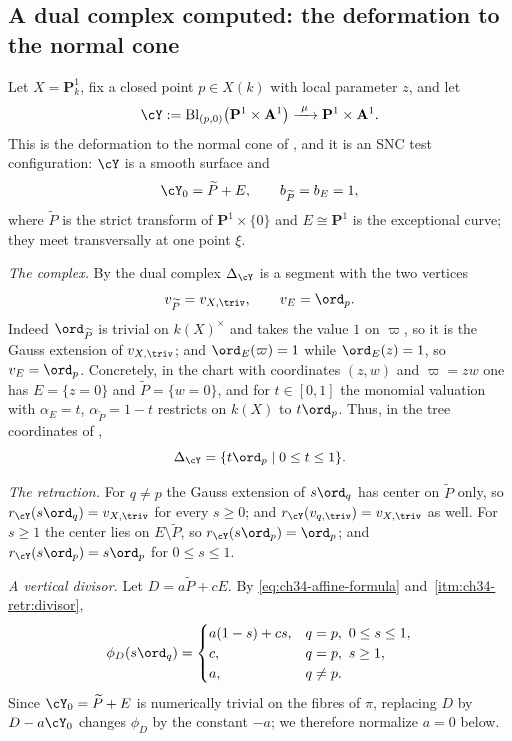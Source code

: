 \subsection{A dual complex computed: the deformation to the normal cone}

\begin{example}
\label{ex:ch34-normal-cone-segment}
Let $X=\mathbf P^1_k$, fix a closed point $p\in X(k)$ with local
parameter $z$, and let
\[
 \cY:=\operatorname{Bl}_{(p,0)}\bigl(\mathbf P^1\times\mathbf A^1\bigr)
 \xrightarrow{\ \mu\ }\mathbf P^1\times\mathbf A^1 .
\]
This is the deformation to the normal cone of ,
and it is an SNC test configuration: $\cY$ is a smooth surface and
\[
 \cY_0=\widetilde P+E,
 \qquad b_{\widetilde P}=b_E=1,
\]
where $\widetilde P$ is the strict transform of $\mathbf P^1\times\{0\}$
and $E\cong\mathbf P^1$ is the exceptional curve; they meet transversally
at one point $\xi$.

\emph{The complex.}  By  the dual complex
$\Delta_{\cY}$ is a segment with the two vertices
\[
 v_{\widetilde P}=v_{X,\triv},
 \qquad
 v_E=\ord_p .
\]
Indeed $\ord_{\widetilde P}$ is trivial on $k(X)^\times$ and takes the
value $1$ on $\varpi$, so it is the Gauss extension of $v_{X,\triv}$;
and $\ord_E(\varpi)=1$ while $\ord_E(z)=1$, so
$v_E=\ord_p$.  Concretely, in the chart with coordinates $(z,w)$ and
$\varpi=zw$ one has $E=\{z=0\}$ and $\widetilde P=\{w=0\}$, and for
$t\in[0,1]$ the monomial valuation with
$\alpha_E=t$, $\alpha_{\widetilde P}=1-t$ restricts on $k(X)$ to
$t\ord_p$.  Thus, in the tree coordinates of ,
\begin{equation}
\label{eq:ch34-segment}
 \Delta_{\cY}=\{t\ord_p\mid 0\le t\le1\}.
\end{equation}

\emph{The retraction.}  For $q\ne p$ the Gauss extension of $s\ord_q$
has center on $\widetilde P$ only, so
$r_{\cY}(s\ord_q)=v_{X,\triv}$ for every $s\ge0$; and
$r_{\cY}(v_{q,\triv})=v_{X,\triv}$ as well.  For $s\ge1$ the center lies
on $E\setminus\widetilde P$, so $r_{\cY}(s\ord_p)=\ord_p$; and
$r_{\cY}(s\ord_p)=s\ord_p$ for $0\le s\le1$.

\emph{A vertical divisor.}  Let $D=a\widetilde P+cE$.  By
\eqref{eq:ch34-affine-formula} and
\,\cref{itm:ch34-retr:divisor},
\begin{equation}
\label{eq:ch34-segment-function}
 \phi_D(s\ord_q)=
 \begin{cases}
 a(1-s)+cs,& q=p,\ 0\le s\le1,\\
 c,& q=p,\ s\ge1,\\
 a,& q\ne p .
 \end{cases}
\end{equation}
Since $\cY_0=\widetilde P+E$ is numerically trivial on the fibres of
$\pi$, replacing $D$ by $D-a\cY_0$ changes $\phi_D$ by the constant
$-a$; we therefore normalize $a=0$ below.


\end{example}
